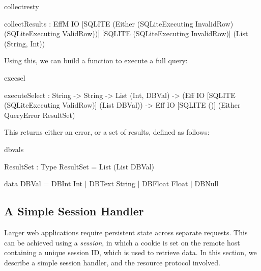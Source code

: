 \begin{SaveVerbatim}{collectresty}

collectResults :
  EffM IO [SQLITE (Either (SQLiteExecuting InvalidRow) 
                          (SQLiteExecuting ValidRow))] 
          [SQLITE (SQLiteExecuting InvalidRow)] 
          (List (String, Int))
\end{SaveVerbatim}


\noindent
{}

\noindent
{}

\noindent
Using this, we can build a function to execute a full query:

\begin{SaveVerbatim}{execsel}

executeSelect : 
  String -> String -> List (Int, DBVal) -> 
  (Eff IO [SQLITE (SQLiteExecuting ValidRow)] 
               (List DBVal)) -> 
  Eff IO [SQLITE ()] (Either QueryError ResultSet)
 
\end{SaveVerbatim}

\noindent
This returns either an error, or a set of results, defined
as follows:

\begin{SaveVerbatim}{dbvals}

ResultSet : Type
ResultSet = List (List DBVal)

data DBVal = DBInt Int     | DBText String
           | DBFloat Float | DBNull

\end{SaveVerbatim}


\subsection{A Simple Session Handler}
Larger web applications require persistent state across separate
requests. This can be achieved using a \textit{session},
in which a cookie is set on the remote host containing a unique session ID,
which is used to retrieve data. In this section, we describe
a simple session handler, and the resource protocol
involved. 


